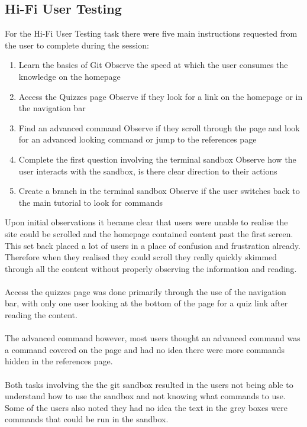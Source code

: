 \subsection{Hi-Fi User Testing}
For the Hi-Fi User Testing task there were five main instructions requested from the user to complete during the session:
\begin{enumerate}
	\item Learn the basics of Git
	\subitem Observe the speed at which the user consumes the knowledge on the homepage
	\item Access the Quizzes page
	\subitem Observe if they look for a link on the homepage or in the navigation bar
	\item Find an advanced command
	\subitem Observe if they scroll through the page and look for an advanced looking command or jump to the references page
	\item Complete the first question involving the terminal sandbox
	\subitem Observe how the user interacts with the sandbox, is there clear direction to their actions
	\item Create a branch in the terminal sandbox
	\subitem Observe if the user switches back to the main tutorial to look for commands
\end{enumerate}
Upon initial observations it became clear that users were unable to realise the site could be scrolled and the homepage contained content past the first screen. This set back placed a lot of users in a place of confusion and frustration already. Therefore when they realised they could scroll they really quickly skimmed through all the content without properly observing the information and reading.\\\\
Access the quizzes page was done primarily through the use of the navigation bar, with only one user looking at the bottom of the page for a quiz link after reading the content.\\\\
The advanced command however, most users thought an advanced command was a command covered on the page and had no idea there were more commands hidden in the references page.\\\\
Both tasks involving the the \gls{git} sandbox resulted in the users not being able to understand how to use the sandbox and not knowing what commands to use. Some of the users also noted they had no idea the text in the grey boxes were commands that could be run in the sandbox.

